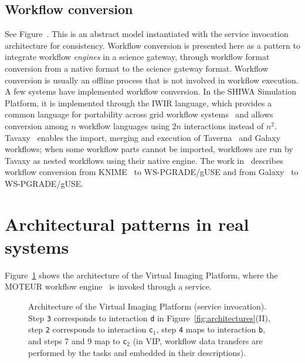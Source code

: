 \documentclass[preprint,3p,twocolumn]{elsarticle}
\newcommand{\todo}[2]{\pdfmargincomment[color=red,author=#1,open=true]{#2}}
\newcommand{\correction}[1]{\color{blue}#1\color{black}\xspace}
\begin{document}
\subsection{Workflow conversion}

See Figure~. This is an abstract model
instantiated with the service invocation architecture for
consistency. \correction{Workflow conversion is presented here as a pattern to
integrate workflow \emph{engines} in a science gateway, through
workflow format conversion from a native format to the science gateway
format.} Workflow conversion is usually an offline process that is not
involved in workflow execution. A few systems have implemented
workflow conversion. In the SHIWA Simulation Platform, it is
implemented through the IWIR language, which provides a common
language for portability across grid workflow
systems~\cite{plankensteiner-prodan-etal:2013} and allows conversion
among $n$ workflow languages using $2n$ interactions instead of $n^2$.
Tavaxy~\cite{Abouelhoda2012} enables the import, merging and execution
of Taverna~\cite{oinn2004taverna} and Galaxy~\cite{goecks2010galaxy}
workflows; when some workflow parts cannot be imported, workflows are
run by Tavaxy as nested workflows using their native engine. The work
in~\cite{delaGarza2016} describes workflow conversion from
KNIME~\cite{Berthold2008} to WS-PGRADE/gUSE and from
Galaxy~\cite{goecks2010galaxy} to WS-PGRADE/gUSE.


\correction{\section{Architectural patterns in real systems}}

\label{sec:real systems}


Figure~\ref{fig:vip-architecture} shows the architecture of the
Virtual Imaging Platform, where the MOTEUR workflow
engine~\cite{GLAT-08i} is invoked through a service.

\begin{figure}
\centering
\def\svgwidth{1.5\columnwidth}

\caption{Architecture of the Virtual Imaging Platform (service
  invocation).  Step \texttt{3} corresponds to interaction \texttt{d}
  in Figure~\ref{fig:architectures}(II), step \texttt{2} corresponds to
  interaction \texttt{c$_1$}, step \texttt{4} maps to interaction
  \texttt{b}, and steps 7 and 9 map to \texttt{c$_2$} (in VIP, workflow data transfers are
  performed by the tasks and embedded in their descriptions).}
\label{fig:vip-architecture}
\end{figure}
\end{document}
